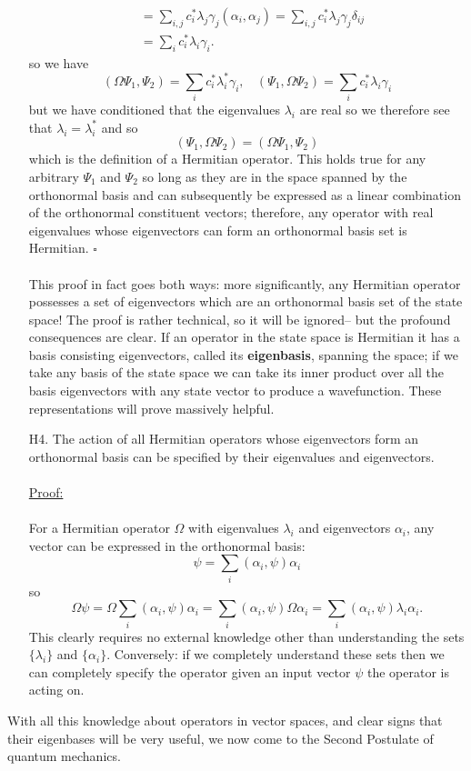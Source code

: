 \begin{enumerate}
$$\begin{aligned}
    &=\sum_{i,j}c_{i}^{\ast}\lambda_{j}\gamma_{j}(\alpha_{i},\alpha_{j})=\sum_{i,j}c_{i}^{\ast}\lambda_{j}\gamma_{j}\delta_{ij}\\
    &=\sum_{i}c_{i}^{\ast}\lambda_{i}\gamma_{i}.
    \end{aligned}
    $$
    so we have 
    $$
    (\Omega\Psi_{1},\Psi_{2})=\sum_{i}c^{\ast}_{i}\lambda^{\ast}_{i}\gamma_{i},\:\:\:\:(\Psi_{1},\Omega\Psi_{2})=\sum_{i}c_{i}^{\ast}\lambda_{i}\gamma_{i}
    $$
    but we have conditioned that the eigenvalues $\lambda_{i}$ are real so we therefore see that $\lambda_{i}=\lambda_{i}^{\ast}$ and so
    $$
    (\Psi_{1},\Omega\Psi_{2})=(\Omega\Psi_{1},\Psi_{2})
    $$
    which is the definition of a Hermitian operator. This holds true for any arbitrary $\Psi_{1}$ and $\Psi_{2}$ so long as they are in the space spanned by the orthonormal basis and can subsequently be expressed as a linear combination of the orthonormal constituent vectors; therefore, any operator with real eigenvalues whose eigenvectors can form an orthonormal basis set is Hermitian. $\square$
    \\\\
    This proof in fact goes both ways: more significantly, any Hermitian operator possesses a set of eigenvectors which are an orthonormal basis set of the state space! The proof is rather technical,
    so it will be ignored-- but the profound consequences are clear. If an operator in the state space is Hermitian it has a basis consisting eigenvectors, called its \textbf{eigenbasis}, spanning the space; if we take any basis of the state space we can take its inner product over all the basis eigenvectors with any state vector to produce a wavefunction. These representations will prove massively helpful.
    \item[H4.] The action of all Hermitian operators whose eigenvectors form an orthonormal basis can be specified by their eigenvalues and eigenvectors.\\\\
    \underline{Proof:}\\\\
    For a Hermitian operator $\Omega$ with eigenvalues $\lambda_{i}$ and eigenvectors $\alpha_{i}$, any vector can be expressed in the orthonormal basis:
    $$
    \psi=\sum_{i}(\alpha_{i},\psi)\alpha_{i}
    $$
    so 
    $$
    \Omega\psi=\Omega\sum_{i}(\alpha_{i},\psi)\alpha_{i}=\sum_{i}(\alpha_{i},\psi)\Omega\alpha_{i}=\sum_{i}(\alpha_{i},\psi)\lambda_{i}\alpha_{i}.
    $$
    This clearly requires no external knowledge other than understanding the sets $\{\lambda_{i}\}$ and $\{\alpha_{i}\}$. Conversely: if we completely understand these sets then we can completely specify the operator given an input vector $\psi$ the operator is acting on. 
\end{enumerate}
With all this knowledge about operators in vector spaces, and clear signs that their eigenbases will be very useful, we now come to the Second Postulate of quantum mechanics.
